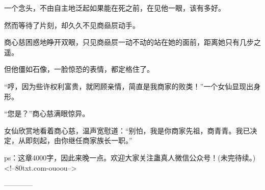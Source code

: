 \begin{this_body}
一个念头，不由自主地泛起如果能在死之前，在见他一眼，该有多好。

然而等待了片刻，却久久不见商赑屃动手。

商心慈困惑地睁开双眼，只见商赑屃一动不动的站在她的面前，距离她只有几步之遥。

但他僵如石像，一脸惊恐的表情，都定格住了。

“哼，因为些许权利富贵，就罔顾亲情，简直是我商家的败类！”一个女仙显现出身形。

“您是？”商心慈满眼惊异。

女仙欣赏地看着商心慈，温声宽慰道：“别怕，我是你商家先祖，商青青。我已决定，从即刻起，由你继任商家族长一职。”

ps：这章4000字，因此来晚一点。欢迎大家关注蛊真人微信公众号！(未完待续。)<!--80txt.com-ouoou-->

------------

\end{this_body}

